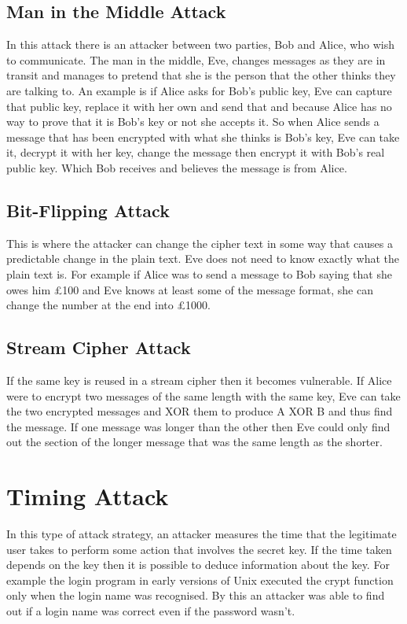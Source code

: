 \subsection{Man in the Middle Attack}
In this attack there is an attacker between two parties, Bob and Alice, who wish to communicate. The man in the middle, Eve, changes messages as they are in transit and manages to pretend that she is the person that the other thinks they are talking to. An example is if Alice asks for Bob's public key, Eve can capture that public key, replace it with her own and send that and because Alice has no way to prove that it is Bob's key or not she accepts it. So when Alice sends a message that has been encrypted with what she thinks is Bob's key, Eve can take it, decrypt it with her key, change the message then encrypt it with Bob's real public key. Which Bob receives and believes the message is from Alice.

\subsection{Bit-Flipping Attack}
This is where the attacker can change the cipher text in some way that causes a predictable change in the plain text. Eve does not need to know exactly what the plain text is. For example if Alice was to send a message to Bob saying that she owes him £100 and Eve knows at least some of the message format, she can change the number at the end into £1000. 

\subsection{Stream Cipher Attack}
If the same key is reused in a stream cipher then it becomes vulnerable. If Alice were to encrypt two messages of the same length with the same key, Eve can take the two encrypted messages and XOR them to produce A XOR B and thus find the message. If one message was longer than the other then Eve could only find out the section of the longer message that was the same length as the shorter.

\section{Timing Attack}
In this type of attack strategy, an attacker measures the time that the legitimate user takes to perform some action that involves the secret key. If the time taken depends on the key then it is possible to deduce information about the key. For example the login program in early versions of Unix executed the crypt function only when the login name was recognised. By this an attacker was able to find out if a login name was correct even if the password wasn't.

